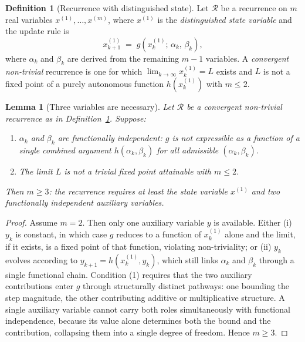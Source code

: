 \documentclass[12pt]{article}
\newtheorem{lemma}[theorem]{Lemma}
\theoremstyle{definition}
\newtheorem{definition}[theorem]{Definition}
\theoremstyle{remark}
\begin{document}
\begin{definition}[Recurrence with distinguished state]\label{def:recurrence}
Let $\mathcal{R}$ be a recurrence on $m$ real variables $x^{(1)}, \ldots, x^{(m)}$,
where $x^{(1)}$ is the \emph{distinguished state variable} and the update rule is
\[
  x^{(1)}_{k+1} \;=\; g\!\left(x^{(1)}_k;\,\alpha_k,\,\beta_k\right),
\]
where $\alpha_k$ and $\beta_k$ are derived from the remaining $m-1$ variables.  A
\emph{convergent non-trivial} recurrence is one for which
$\lim_{k \to \infty} x^{(1)}_k = L$ exists and $L$ is not a fixed point of a purely
autonomous function $h(x^{(1)}_k)$ with $m \le 2$.
\end{definition}

\begin{lemma}[Three variables are necessary]\label{lem:three-vars}
Let $\mathcal{R}$ be a convergent non-trivial recurrence as in Definition~\ref{def:recurrence}.
Suppose:
\begin{enumerate}
  \item $\alpha_k$ and $\beta_k$ are \emph{functionally independent}: $g$ is not
        expressible as a function of a single combined argument $h(\alpha_k,\beta_k)$
        for all admissible $(\alpha_k,\beta_k)$.
  \item The limit $L$ is not a trivial fixed point attainable with $m \le 2$.
\end{enumerate}
Then $m \ge 3$: the recurrence requires at least the state variable $x^{(1)}$ and two
functionally independent auxiliary variables.
\end{lemma}
\begin{proof}
Assume $m = 2$.  Then only one auxiliary variable $y$ is available.  Either (i) $y_k$
is constant, in which case $g$ reduces to a function of $x^{(1)}_k$ alone and the
limit, if it exists, is a fixed point of that function, violating non-triviality; or
(ii) $y_k$ evolves according to $y_{k+1} = h(x^{(1)}_k, y_k)$, which still links
$\alpha_k$ and $\beta_k$ through a single functional chain.  Condition (1) requires
that the two auxiliary contributions enter $g$ through structurally distinct pathways:
one bounding the step magnitude, the other contributing additive or multiplicative
structure.  A single auxiliary variable cannot carry both roles simultaneously with
functional independence, because its value alone determines both the bound and the
contribution, collapsing them into a single degree of freedom.  Hence $m \ge 3$.
\end{proof}
\end{document}
